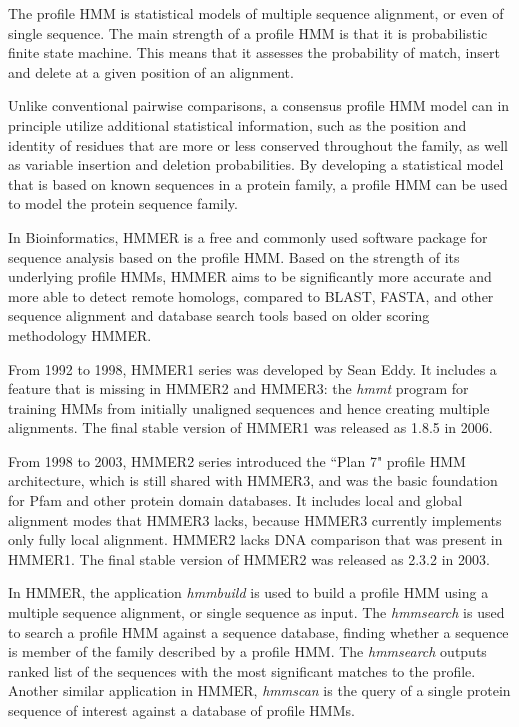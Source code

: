 The profile HMM is statistical models of multiple sequence alignment, or even of single sequence. The main strength of a profile HMM is that it is probabilistic finite state machine. This means that it assesses the probability of match, insert and delete at a given position of an alignment.

Unlike conventional pairwise comparisons, a consensus profile HMM model can in principle utilize additional statistical information, such as the position and identity of residues that are more or less conserved throughout the family, as well as variable insertion and deletion probabilities. By developing a statistical model that is based on known sequences in a protein family, a profile HMM can be used to model the protein sequence family.

In Bioinformatics, HMMER \citep{HMMER} is a free and commonly used software package for sequence analysis based on the profile HMM. 
Based on the strength of its underlying profile HMMs, HMMER aims to be significantly more accurate and more able to detect remote homologs, compared to BLAST, FASTA, and other sequence alignment and database search tools based on older scoring methodology {HMMER}.

From 1992 to 1998, HMMER1 series was developed by Sean Eddy. It includes a feature that is missing in HMMER2 and HMMER3: the \emph{hmmt} program for training HMMs from initially unaligned sequences and hence creating multiple alignments. The final stable version of HMMER1 was released as 1.8.5 in 2006. 

From 1998 to 2003, HMMER2 series introduced the ``Plan 7" profile HMM architecture, which is still shared with HMMER3, and was the basic foundation for Pfam and other protein domain databases. It includes local and global alignment modes that HMMER3 lacks, because HMMER3 currently implements only fully local alignment. HMMER2 lacks DNA comparison that was present in HMMER1. The final stable version of HMMER2 was released as 2.3.2 in 2003.

In HMMER, the application \emph{hmmbuild} is used to build a profile HMM using a multiple sequence alignment, or single sequence as input. The \emph{hmmsearch} is used to search a profile HMM against a sequence database, finding whether a sequence is member of the family described by a profile HMM. The \emph{hmmsearch} outputs ranked list of the sequences with the most significant matches to the profile. Another similar application in HMMER, \emph{hmmscan} is the query of a single protein sequence of interest against a database of profile HMMs.

